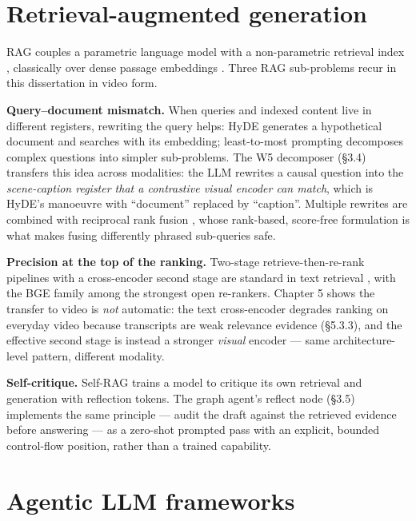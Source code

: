 \section{Retrieval-augmented
generation}

RAG couples a parametric language model with a non-parametric retrieval
index \autocite{lewis2020rag,guu2020realm}, classically over dense
passage embeddings \autocite{karpukhin2020dpr}. Three RAG sub-problems
recur in this dissertation in video form.

\textbf{Query--document mismatch.} When queries and indexed content live
in different registers, rewriting the query helps: HyDE
\autocite{gao2023hyde} generates a hypothetical document and searches
with its embedding; least-to-most prompting
\autocite{zhou2023leasttomost} decomposes complex questions into simpler
sub-problems. The W5 decomposer (§3.4) transfers this idea across
modalities: the LLM rewrites a causal question into the
\emph{scene-caption register that a contrastive visual encoder can
match}, which is HyDE's manoeuvre with ``document'' replaced by
``caption''. Multiple rewrites are combined with reciprocal rank fusion
\autocite{cormack2009rrf}, whose rank-based, score-free formulation is
what makes fusing differently phrased sub-queries safe.

\textbf{Precision at the top of the ranking.} Two-stage
retrieve-then-re-rank pipelines with a cross-encoder second stage are
standard in text retrieval \autocite{nogueira2019bertrerank}, with the
BGE family \autocite{chen2024bgem3} among the strongest open re-rankers.
Chapter 5 shows the transfer to video is \emph{not} automatic: the text
cross-encoder degrades ranking on everyday video because transcripts are
weak relevance evidence (§5.3.3), and the effective second stage is
instead a stronger \emph{visual} encoder --- same architecture-level
pattern, different modality.

\textbf{Self-critique.} Self-RAG \autocite{asai2024selfrag} trains a
model to critique its own retrieval and generation with reflection
tokens. The graph agent's reflect node (§3.5) implements the same
principle --- audit the draft against the retrieved evidence before
answering --- as a zero-shot prompted pass with an explicit, bounded
control-flow position, rather than a trained capability.

\section{Agentic LLM frameworks}

